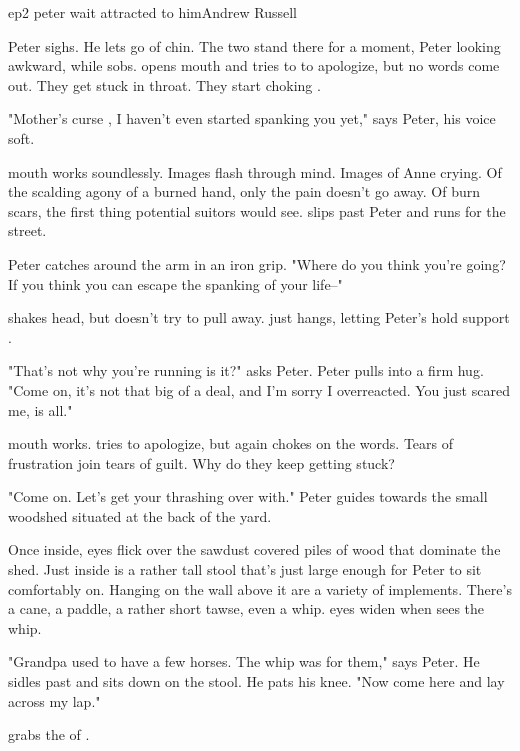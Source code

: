 \documentclass{book}
\begin{document}
\begin{childnode}{ep2 peter wait attracted to him}{Andrew Russell}

    Peter sighs. He lets go of \names{} chin. The two stand there for a moment, Peter looking awkward, while \name{} sobs. \HeShe{} opens \hisher{} mouth and tries to to apologize, but no words come out. They get stuck in \hisher{} throat. They start choking
    \himher{}.

    "Mother's curse \manwoman{}, I haven't even started spanking you yet," says Peter, his voice soft. 

    \names{} mouth works soundlessly. Images flash through \hisher{} mind. Images of Anne crying. Of the scalding agony of a burned hand, only the pain doesn't go away. Of burn scars, the first thing potential suitors would see. \name{} slips past Peter and runs for 
    the street.

    Peter catches \himher{} around the arm in an iron grip. "Where do you think you're going? If you think you can escape the spanking of your life--"

    \name{} shakes \hisher{} head, but doesn't try to pull away. \HeShe{} just hangs, letting Peter's hold support \himher{}.

    "That's not why you're running is it?" asks Peter. Peter pulls \name{} into a firm hug. "Come on, it's not that big of a deal, and I'm sorry I overreacted. You just scared me, is all."

    \names{} mouth works. \HeShe{} tries to apologize, but again \heshe{} chokes on the words. Tears of frustration join \hisher{} tears of guilt. Why do they keep getting stuck? 

    "Come on. Let's get your thrashing over with." Peter guides \name{} towards the small woodshed situated at the back of the yard.

    Once inside, \names{} eyes flick over the sawdust covered piles of wood that dominate the shed. Just inside is a rather tall stool that's just large enough for Peter to sit comfortably on. Hanging on the wall above it are a variety of implements. There's a cane, 
    a paddle,
    a rather short tawse, even a whip. \names{} eyes widen when \heshe{} sees the whip.

    "Grandpa used to have a few horses. The whip was for them," says Peter. He sidles past \name{} and sits down on the stool. He pats 
    his knee. "Now come here and lay across my lap."

    \name{} grabs the  of \hisher{} \trousers{}.


\end{childnode}
\end{document}
